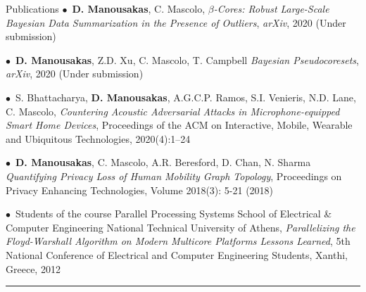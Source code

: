 \documentclass[11pt]{resume}
\begin{document}
\begin{category}{Publications}
\citemnobullet $\bullet$~\textbf{D. Manousakas}, C. Mascolo, \emph{$\beta$-Cores: Robust Large-Scale Bayesian Data Summarization in the Presence of Outliers}, \emph{arXiv}, 2020 (Under submission)

\citemnobullet $\bullet$~\textbf{D. Manousakas}, Z.D. Xu, C. Mascolo, T. Campbell \emph{Bayesian Pseudocoresets}, \emph{arXiv}, 2020 (Under submission)

\citemnobullet $\bullet$~S. Bhattacharya, \textbf{D. Manousakas}, A.G.C.P. Ramos, S.I. Venieris, N.D. Lane, C. Mascolo, \emph{Countering Acoustic Adversarial Attacks in Microphone-equipped Smart Home Devices}, Proceedings of the ACM on Interactive, Mobile, Wearable and Ubiquitous Technologies, 2020(4):1--24

\citemnobullet $\bullet$~\textbf{D. Manousakas}, C. Mascolo, A.R. Beresford, D. Chan, N. Sharma \emph{Quantifying Privacy Loss of Human Mobility Graph Topology}, Proceedings on Privacy Enhancing Technologies, Volume 2018(3): 5-21 (2018)

\citemnobullet $\bullet$~Students of the course Parallel Processing Systems  School of Electrical \& Computer Engineering National Technical University of Athens,
\textit{Parallelizing the Floyd-Warshall Algorithm on
	Modern Multicore Platforms
	Lessons Learned}, 5th National Conference of Electrical and Computer Engineering Students, Xanthi, Greece, 2012 

\noindent\rule{\textwidth}{0.2pt}
\end{category}
\end{document}
